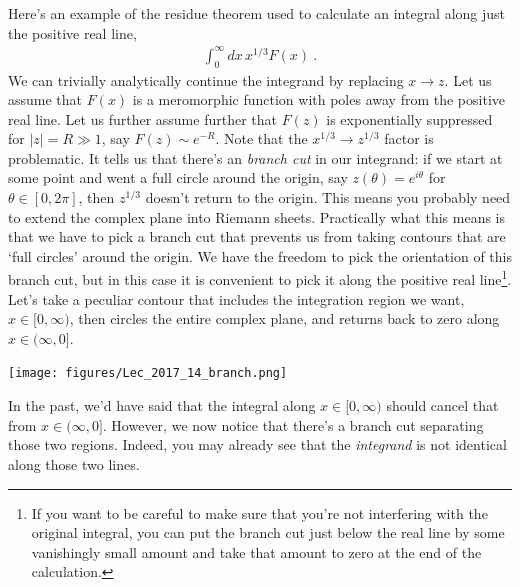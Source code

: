  Here's an example of the residue theorem used to calculate an integral along just the positive real line,
 \begin{align}
 	\int_0^\infty dx\, x^{1/3} F(x) \ .
 \end{align}
 We can trivially analytically continue the integrand by replacing $x\to z$. Let us assume that $F(x)$ is a meromorphic function with poles away from the positive real line. Let us further assume further that $F(z)$ is exponentially suppressed for $|z| = R \gg 1$, say $F(z)\sim e^{-R}$. Note that the $x^{1/3} \to z^{1/3}$ factor is problematic. It tells us that there's an \emph{branch cut} in our integrand: if we start at some point and went a full circle around the origin, say $z(\theta) = e^{i\theta}$ for $\theta\in[0,2\pi]$, then $z^{1/3}$ doesn't return to the origin. This means you probably need to extend the complex plane into Riemann sheets. Practically what this means is that we have to pick a branch cut that prevents us from taking contours that are `full circles' around the origin. We have the freedom to pick the orientation of this branch cut, but in this case it is convenient to pick it along the positive real line\footnote{If you want to be careful to make sure that you're not interfering with the original integral, you can put the branch cut just below the real line by some vanishingly small amount and take that amount to zero at the end of the calculation.}. Let's take a peculiar contour that includes the integration region we want, $x\in [0,\infty)$, then circles the entire complex plane, and returns back to zero along $x\in (\infty, 0]$. 
 \begin{center}
 \texttt{[image: figures/Lec\_2017\_14\_branch.png]}
 \end{center}
 In the past, we'd have said that the integral along $x\in [0, \infty)$ should cancel that from $x\in (\infty, 0]$. However, we now notice that there's a branch cut separating those two regions. Indeed, you may already see that the \emph{integrand} is not identical along those two lines. 

